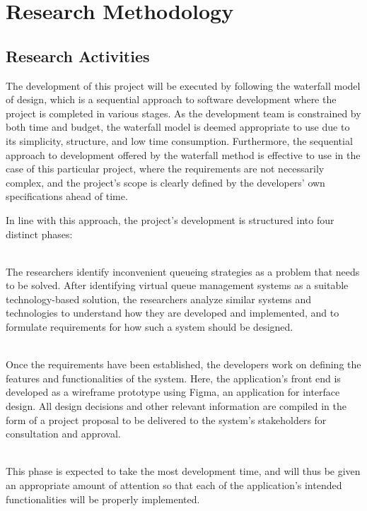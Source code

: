 \chapter{Research Methodology}

\section{Research Activities}

The development of this project will be executed by following the waterfall model of design, which is a sequential approach to software development where the project is completed in various stages. As the development team is constrained by both time and budget, the waterfall model is deemed appropriate to use due to its simplicity, structure, and low time consumption. Furthermore, the sequential approach to development offered by the waterfall method is effective to use in the case of this particular project, where the requirements are not necessarily complex, and the project’s scope is clearly defined by the developers’ own specifications ahead of time.

In line with this approach, the project’s development is structured into four distinct phases:

 \\
The researchers identify inconvenient queueing strategies as a problem that needs to be solved. After identifying virtual queue management systems as a suitable technology-based solution, the researchers analyze similar systems and technologies to understand how they are developed and implemented, and to formulate requirements for how such a system should be designed. 

 \\
Once the requirements have been established, the developers work on defining the features and functionalities of the system. 
Here, the application’s front end is developed as a wireframe prototype using Figma, an application for interface design.
All design decisions and other relevant information are compiled in the form of a project proposal to be delivered to the system’s stakeholders for consultation and approval.


 \\
This phase is expected to take the most development time, and will thus be given an appropriate amount of attention so that each of the application’s intended functionalities will be properly implemented.

